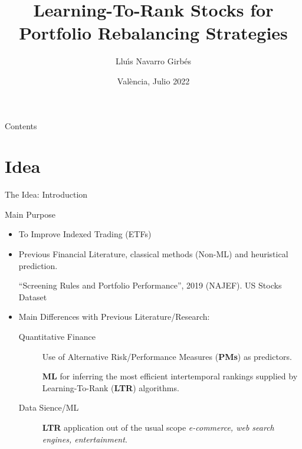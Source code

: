 \documentclass[ucs,8pt,handout]{beamer}
\title[LTR]{Learning-To-Rank Stocks for Portfolio Rebalancing Strategies}
\author{Llu\'\i s Navarro Girb\'es}
\date{Val\`encia, Julio 2022}
\begin{document}
\begin{frame}[plain]
  \titlepage
\end{frame}

\begin{frame}{Contents}
   \tableofcontents
\end{frame}

\section{Idea}

\begin{frame}{The Idea: Introduction}
  \centering
  
  \begin{block}{Main Purpose}
    \begin{itemize}
    \item To Improve Indexed Trading (ETFs)  
    \item Previous Financial Literature, classical methods (Non-ML) and
      heuristical prediction.

      ``Screening Rules and Portfolio Performance'', 2019 (NAJEF). US
      Stocks Dataset
    \item Main Differences with Previous Literature/Research:
      \begin{description}
      \item[Quantitative Finance] Use of Alternative
        Risk/Performance Measures ({\bf PMs}) as predictors.

        {\bf ML} for inferring the most efficient intertemporal rankings
        supplied by Learning-To-Rank ({\bf LTR}) algorithms.    
      \item[Data Sience/ML] {\bf LTR} application out of the
        usual scope {\sl e-commerce, web search engines, entertainment}.
      \end{description}
    \end{itemize}
  \end{block}
\end{frame}
\end{document}
